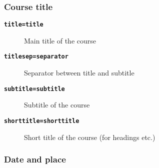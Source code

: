 \documentclass[english]{article}
\newcommand*\joption[1]{\textbf{\texttt{#1}}}
\newcommand*\jparam[1]{\angus #1\angud}
\begin{document}
\subsubsection{Course title}
\begin{description}
\item [\joption{title=\jparam{title}}] Main title of the course
\item [\joption{titlesep=\jparam{separator}}] Separator between title and subtitle
\item [\joption{subtitle=\jparam{subtitle}}] Subtitle of the course
\item [\joption{shorttitle=\jparam{shorttitle}}] Short title of the course (for headings etc.)
\end{description}

\subsubsection{Date and place\label{sec:date-and-place}}
\end{document}
